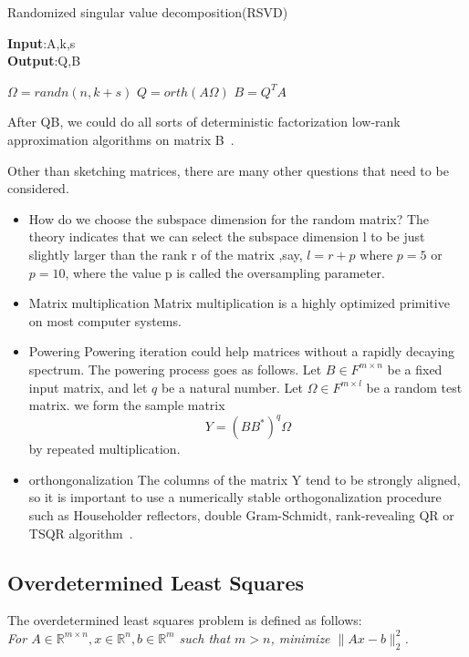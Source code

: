 \documentclass{article}
\begin{document}
\begin{algorithm}
	\caption{Randomized singular value decomposition(RSVD)} 
    \textbf{Input}:A,k,s\\
    \textbf{Output}:Q,B
	\begin{algorithmic}[1]
		\State$\Omega=randn(n,k+s)$
        \State$Q=orth(A\Omega)$
        \State$B=Q^TA$
	\end{algorithmic} 
    \label{algorithm 1}
\end{algorithm}
After QB, we could do all sorts of deterministic factorization low-rank approximation algorithms on matrix B~\cite{halko2010findingstructurerandomnessprobabilistic}.%

Other than sketching matrices, there are many other questions that need to be considered.
\begin{itemize}
    \item How do we choose the subspace dimension for the random matrix?
     The theory\cite{halko2011finding} indicates that we can select the subspace dimension l to be just slightly larger than the rank r of the matrix ,say, $l=r+p$ where $p=5$ or $p=10$, where the value p is called the oversampling parameter.
    \item Matrix multiplication 
    Matrix multiplication is a highly optimized primitive on most computer systems.
    \item Powering Powering iteration could help matrices without a rapidly decaying spectrum. The powering process goes as follows. Let $B\in F^{m\times n}$ be a fixed input matrix, and let $q$ be a natural number. Let $\Omega\in F^{m\times l}$ be a random test matrix. we form the sample matrix \[Y=(BB^*)^q\Omega\] by repeated multiplication.
    \item orthongonalization The columns of the matrix Y tend to be strongly aligned, so it is important to use a numerically stable orthogonalization procedure such as Householder reflectors, double Gram-Schmidt, rank-revealing QR or TSQR algorithm~\cite{DBLP:journals/corr/abs-0806-2159}.


\end{itemize}


\subsection{Overdetermined Least Squares}
\label{sec:least_squares}
The overdetermined least squares problem is defined as follows: \\

\textit{For $A \in \mathbb{R}^{m \times n}, x \in \mathbb{R}^{n}, b \in \mathbb{R}^{m}$ such that $m > n$, minimize $\|Ax - b\|_2^2$.}\\
\end{document}

